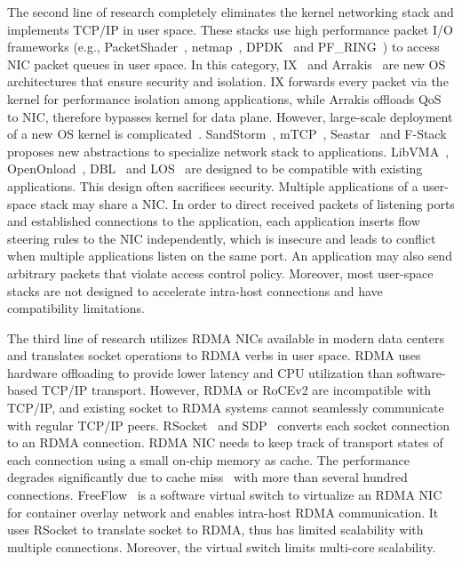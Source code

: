 The second line of research completely eliminates the kernel networking stack and implements TCP/IP in user space.
These stacks use high performance packet I/O frameworks (e.g., PacketShader~\cite{han2010packetshader}, netmap~\cite{rizzo2012netmap},  DPDK~\cite{dpdk} and PF\_RING~\cite{pf-ring}) to access NIC packet queues in user space.
In this category, IX~\cite{belay2017ix} and Arrakis~\cite{peter2016arrakis} are new OS architectures that ensure security and isolation.
IX forwards every packet via the kernel for performance isolation among applications, while Arrakis offloads QoS to NIC, therefore bypasses kernel for data plane.
However, large-scale deployment of a new OS kernel is complicated~\cite{andromeda}.
SandStorm~\cite{marinos2014network}, mTCP~\cite{jeong2014mtcp}, Seastar~\cite{seastar} and F-Stack~\cite{fstack} proposes new abstractions to specialize network stack to applications.
LibVMA~\cite{libvma}, OpenOnload~\cite{openonload}, DBL~\cite{dbl} and LOS~\cite{huang2017high} are designed to be compatible with existing applications.
This design often sacrifices security. Multiple applications of a user-space stack may share a NIC.
In order to direct received packets of listening ports and established connections to the application, 
each application inserts flow steering rules to the NIC independently, which is insecure and leads to conflict when multiple applications listen on the same port.
An application may also send arbitrary packets that violate access control policy.
Moreover, most user-space stacks are not designed to accelerate intra-host connections and have compatibility limitations.

The third line of research utilizes RDMA NICs available in modern data centers~\cite{guo2016rdma} and translates socket operations to RDMA verbs in user space.
RDMA uses hardware offloading to provide lower latency and CPU utilization than software-based TCP/IP transport.
However, RDMA or RoCEv2 are incompatible with TCP/IP, and existing socket to RDMA systems cannot seamlessly communicate with regular TCP/IP peers.
RSocket~\cite{rsockets} and SDP~\cite{socketsdirect} converts each socket connection to an RDMA connection.
RDMA NIC needs to keep track of transport states of each connection using a small on-chip memory as cache.
The performance degrades significantly due to cache miss~\cite{mprdma,kaminsky2016design} with more than several hundred connections.
FreeFlow~\cite{freeflow} is a software virtual switch to virtualize an RDMA NIC for container overlay network and enables intra-host RDMA communication.
It uses RSocket to translate socket to RDMA, thus has limited scalability with multiple connections.
Moreover, the virtual switch limits multi-core scalability.

